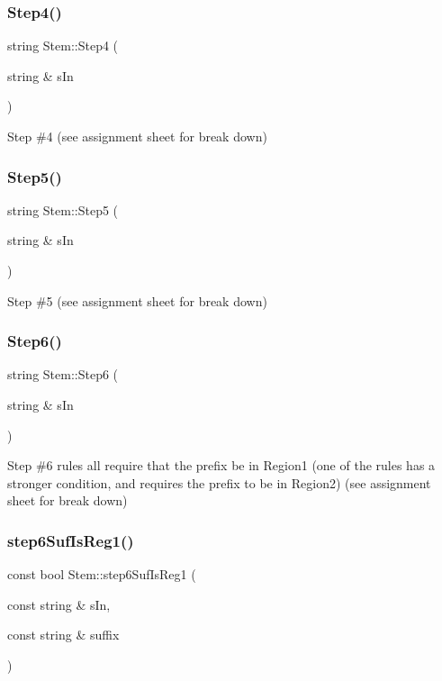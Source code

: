 \subsubsection{\texorpdfstring{Step4()}{Step4()}}
{\footnotesize\ttfamily string Stem\+::\+Step4 (\begin{DoxyParamCaption}\item[{string \&}]{s\+In }\end{DoxyParamCaption})}

Step \#4 (see assignment sheet for break down) \mbox{\label{class_stem_af58972e6f9b64d6ca8fa18a6db13a5a6}} 
\subsubsection{\texorpdfstring{Step5()}{Step5()}}
{\footnotesize\ttfamily string Stem\+::\+Step5 (\begin{DoxyParamCaption}\item[{string \&}]{s\+In }\end{DoxyParamCaption})}

Step \#5 (see assignment sheet for break down) \mbox{\label{class_stem_a32d6b1690a87ce0f3f768e2be07bdcb5}} 
\subsubsection{\texorpdfstring{Step6()}{Step6()}}
{\footnotesize\ttfamily string Stem\+::\+Step6 (\begin{DoxyParamCaption}\item[{string \&}]{s\+In }\end{DoxyParamCaption})}

Step \#6 rules all require that the prefix be in Region1 (one of the rules has a stronger condition, and requires the prefix to be in Region2) (see assignment sheet for break down) \mbox{\label{class_stem_a2a6706d496bb435848a5b585cd53503e}} 
\subsubsection{\texorpdfstring{step6\+Suf\+Is\+Reg1()}{step6SufIsReg1()}}
{\footnotesize\ttfamily const bool Stem\+::step6\+Suf\+Is\+Reg1 (\begin{DoxyParamCaption}\item[{const string \&}]{s\+In,  }\item[{const string \&}]{suffix }\end{DoxyParamCaption})}

